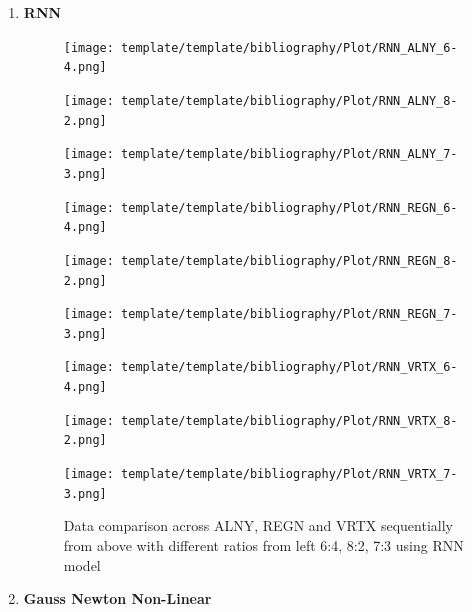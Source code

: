 \documentclass{ieeeojies}
\begin{document}
\begin{enumerate}
  \item \textbf{RNN} 
\begin{figure}[H]
    \centering
    \begin{minipage}{0.155\textwidth}
    \centering
    \texttt{[image: template/template/bibliography/Plot/RNN\_ALNY\_6-4.png]}
    \end{minipage}
    \hfill
    \begin{minipage}{0.155\textwidth}
    \centering
    \texttt{[image: template/template/bibliography/Plot/RNN\_ALNY\_8-2.png]}
    \end{minipage}
    \hfill
    \begin{minipage}{0.155\textwidth}
    \centering
    \texttt{[image: template/template/bibliography/Plot/RNN\_ALNY\_7-3.png]}
    \end{minipage}
    \hfill
    \begin{minipage}{0.155\textwidth}
    \centering
    \texttt{[image: template/template/bibliography/Plot/RNN\_REGN\_6-4.png]}
    \end{minipage}
    \hfill
    \begin{minipage}{0.155\textwidth}
    \centering
    \texttt{[image: template/template/bibliography/Plot/RNN\_REGN\_8-2.png]}
    \end{minipage}
    \hfill
    \begin{minipage}{0.155\textwidth}
    \centering
    \texttt{[image: template/template/bibliography/Plot/RNN\_REGN\_7-3.png]}
    \end{minipage}
    \hfill
    \begin{minipage}{0.155\textwidth}
    \centering
    \texttt{[image: template/template/bibliography/Plot/RNN\_VRTX\_6-4.png]}
    \end{minipage}
    \hfill
    \begin{minipage}{0.155\textwidth}
    \centering
    \texttt{[image: template/template/bibliography/Plot/RNN\_VRTX\_8-2.png]}
    \end{minipage}
    \hfill
    \begin{minipage}{0.155\textwidth}
    \centering
    \texttt{[image: template/template/bibliography/Plot/RNN\_VRTX\_7-3.png]}
    \end{minipage}
\caption{Data comparison across ALNY, REGN and VRTX sequentially from above with different ratios from left 6:4, 8:2, 7:3 using RNN model}
\label{fig:combined}
\end{figure}
  \item \textbf{Gauss Newton Non-Linear} 
  \begin{figure}[H]

\end{figure}
\end{enumerate}
\end{document}
